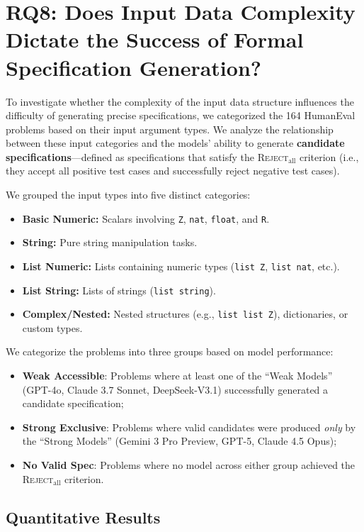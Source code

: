 \section{RQ8: Does Input Data Complexity Dictate the Success of Formal Specification Generation?}
\label{appendix:rq8}

To investigate whether the complexity of the input data structure influences the difficulty of generating precise specifications, we categorized the 164 HumanEval problems based on their input argument types. 
We analyze the relationship between these input categories and the models' ability to generate \textbf{candidate specifications}---defined as specifications that satisfy the \textsc{Reject}$_{\text{all}}$ criterion (i.e., they accept all positive test cases and successfully reject negative test cases).

We grouped the input types into five distinct categories:
\begin{itemize}
    \item \textbf{Basic Numeric:} Scalars involving \texttt{Z}, \texttt{nat}, \texttt{float}, and \texttt{R}.
    \item \textbf{String:} Pure string manipulation tasks.
    \item \textbf{List Numeric:} Lists containing numeric types (\texttt{list Z}, \texttt{list nat}, etc.).
    \item \textbf{List String:} Lists of strings (\texttt{list string}).
    \item \textbf{Complex/Nested:} Nested structures (e.g., \texttt{list list Z}), dictionaries, or custom types.
\end{itemize}

We categorize the problems into three groups based on model performance:
\begin{itemize}
    \item \textbf{Weak Accessible}: Problems where at least one of the ``Weak Models'' (GPT-4o, Claude 3.7 Sonnet, DeepSeek-V3.1) successfully generated a candidate specification; 
    \item \textbf{Strong Exclusive}: Problems where valid candidates were produced \emph{only} by the ``Strong Models'' (Gemini 3 Pro Preview, GPT-5, Claude 4.5 Opus); 
    \item \textbf{No Valid Spec}: Problems where no model across either group achieved the \textsc{Reject}$_{\text{all}}$ criterion.
\end{itemize}

\subsection{Quantitative Results}

